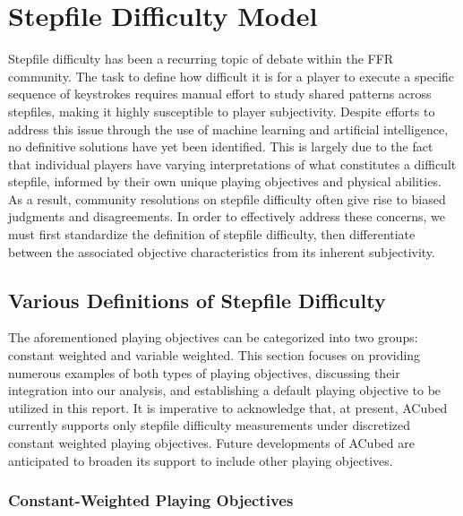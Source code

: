 \section{Stepfile Difficulty Model}
\label{sec:stepfile_difficulty}

Stepfile difficulty has been a recurring topic of debate within the FFR community. The task to define how difficult it is for a player to execute a specific sequence of keystrokes requires manual effort to study shared patterns across stepfiles, making it highly susceptible to player subjectivity. Despite efforts to address this issue through the use of machine learning and artificial intelligence, no definitive solutions have yet been identified. This is largely due to the fact that individual players have varying interpretations of what constitutes a difficult stepfile, informed by their own unique playing objectives and physical abilities. As a result, community resolutions on stepfile difficulty often give rise to biased judgments and disagreements. In order to effectively address these concerns, we must first standardize the definition of stepfile difficulty, then differentiate between the associated objective characteristics from its inherent subjectivity.

\subsection{Various Definitions of Stepfile Difficulty}

The aforementioned playing objectives can be categorized into two groups: constant weighted and variable weighted. This section focuses on providing numerous examples of both types of playing objectives, discussing their integration into our analysis, and establishing a default playing objective to be utilized in this report. It is imperative to acknowledge that, at present, ACubed currently supports only stepfile difficulty measurements under discretized constant weighted playing objectives. Future developments of ACubed are anticipated to broaden its support to include other playing objectives.

\subsubsection{Constant-Weighted Playing Objectives}

